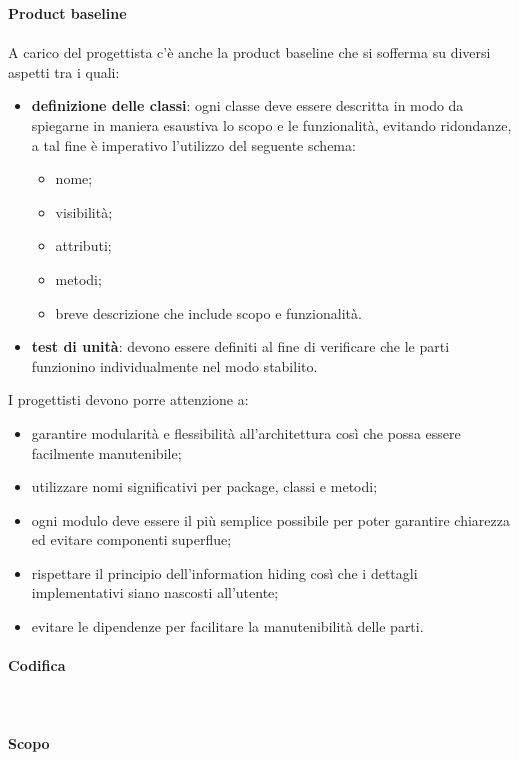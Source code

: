 			\noindent\textbf{Product baseline} \mbox{}\\ \mbox{}\\
	
			\noindent A carico del progettista c'è anche la product baseline che si sofferma su diversi aspetti tra i quali:
			\begin{itemize}
				\item \textbf{definizione delle classi}: ogni classe deve essere descritta 
					in modo da spiegarne in maniera esaustiva lo scopo e le funzionalità, evitando 
					ridondanze, a tal fine è imperativo l'utilizzo del seguente 
					schema:
					\begin{itemize}
						\item nome;
						\item visibilità;
						\item attributi;
						\item metodi;
						\item breve descrizione che include scopo e 
						funzionalità.
					\end{itemize}
				\item \textbf{test di unità}: devono essere definiti al fine di verificare 
					che le parti funzionino individualmente nel modo stabilito.
			\end{itemize}
			
		\noindent I progettisti devono porre attenzione a:
		\begin{itemize}
			\item garantire modularità e flessibilità all'architettura così che possa
			essere facilmente manutenibile;
			\item utilizzare nomi significativi per package, classi e metodi;
			\item ogni modulo deve essere il più semplice possibile per poter garantire
			chiarezza ed evitare componenti superflue;
			\item rispettare il principio dell'information hiding così che i dettagli 
			implementativi siano nascosti all'utente;
			\item evitare le dipendenze per facilitare la manutenibilità delle parti.
		\end{itemize}
			
				
		\paragraph{Codifica}
			\mbox{}\\ \mbox{}\\
			\noindent\textbf{Scopo} \mbox{}\\
	
